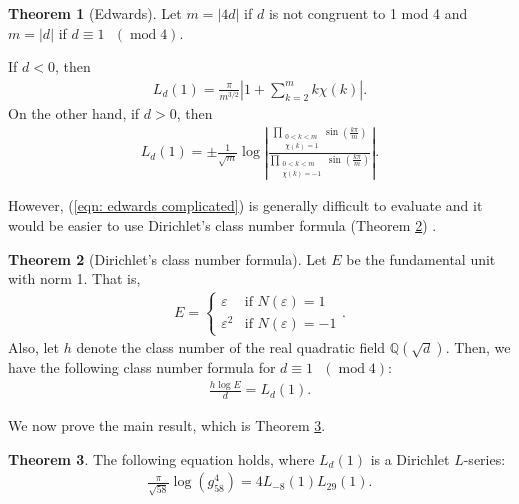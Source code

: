 \documentclass[11pt]{amsart}
\theoremstyle{definition}
\newtheorem{theorem}{Theorem}[section]
\numberwithin{theorem}{section}
\begin{document}
\begin{theorem}[Edwards]\label{edwards main theorem on calculating l series}
Let $m=\left|4d\right|$ if $d$ is not congruent to 1 mod 4 and $m=\left|d\right|$ if $d\equiv 1\text{ }\left(\operatorname{mod}4\right)$. 

If $d<0$, then \begin{align*}
    L_d\left(1\right)=\frac{\pi}{m^{3/2}}\left|1+\sum_{k=2}^{m}k\chi\left(k\right)\right|.
\end{align*}
On the other hand, if $d>0$, then \begin{align}\label{eqn: edwards complicated}
    L_d\left(1\right)=\pm \frac{1}{\sqrt{m}}\operatorname{log}\left|\frac{\displaystyle\prod_{\substack{0<k<m \\ \chi(k) = 1 }}  \operatorname{sin}\left(\frac{k\pi}{m}\right)}{\displaystyle\prod_{\substack{0<k<m \\ \chi(k) = -1 }} \operatorname{sin}\left(\frac{k\pi}{m}\right)}\right|.
\end{align}
\end{theorem}
However, (\ref{eqn: edwards complicated}) is generally difficult to evaluate and it would be easier to use Dirichlet's class number formula (Theorem \ref{class number formula}) \cite{edwards}.
\begin{theorem}[Dirichlet's class number formula]\label{class number formula}
Let $E$ be the fundamental unit with norm 1. That is,
\begin{align*}
    E=\begin{cases}
        \varepsilon& \text{if } N(\varepsilon)=1\\
        \varepsilon^2& \text{if } N(\varepsilon)=-1
    \end{cases}.
\end{align*}
Also, let $h$ denote the class number of the real quadratic field $\mathbb{Q}(\sqrt{d})$. Then, we have the following class number formula for $d\equiv 1\text{ }\left(\operatorname{mod}4\right)$: \begin{align*}
    \frac{h\operatorname{log}E}{d}=L_d\left(1\right).
\end{align*}
\end{theorem}
We now prove the main result, which is Theorem \ref{g invariant theorem}.
\begin{theorem}\label{g invariant theorem} The following equation holds, where $L_d\left(1\right)$ is a Dirichlet $L$-series:
\begin{align}
\frac{\pi}{\sqrt{58}}\operatorname{log}\left(g_{58}^4\right)=4L_{-8}\left(1\right)L_{29}\left(1\right).
\end{align}
\end{theorem}
\end{document}
